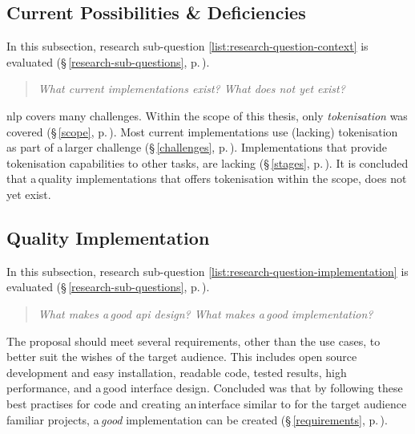 \subsection{Current Possibilities \&
  Deficiencies}\label{q-current-possibilities}

In this subsection, research sub-question \ref{list:research-question-context}
  is evaluated (§\,\ref{research-sub-questions},
  p.\,\pageref{list:research-question-implementation}).

\begin{quote}
  \textit{What current implementations exist? What does not yet exist?}
\end{quote}

\noindent\gls{nlp} covers many challenges.
Within the scope of this thesis, only \emph{tokenisation} was covered
  (§\,\ref{scope}, p.\,\pageref{scope}).
Most current implementations use (lacking) tokenisation as part of a\,larger
  challenge (§\,\ref{challenges}, p.\,\pageref{challenges}).
Implementations that provide tokenisation capabilities to other tasks,
  are lacking (§\,\ref{stages}, p.\,\pageref{stages}).
It is concluded that a\,quality implementations that offers tokenisation
  within the scope, does not yet exist.

\subsection{Quality Implementation}\label{q-quality-implementation}

In this subsection, research sub-question
  \ref{list:research-question-implementation} is evaluated
  (§\,\ref{research-sub-questions},
  p.\,\pageref{list:research-question-implementation}).

\noindent\begin{quote}
  \textit{What makes a\,good \gls{api} design? What makes a\,good
    implementation?}
\end{quote}

The proposal should meet several requirements, other than the use cases,
  to better suit the wishes of the target audience.
This includes open source development and easy installation, readable code,
  tested results, high performance, and a\,good interface design.
Concluded was that by following these best practises for code and creating
  an\,interface similar to for the target audience familiar projects,
  a\,\emph{good} implementation can be created (§\,\ref{requirements},
  p.\,\pageref{requirements}).


